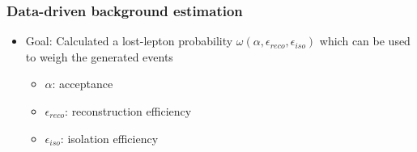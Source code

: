 \begin{frame}
  \frametitle{Data-driven background estimation}
  \begin{itemize}
    \item Goal: Calculated a lost-lepton probability $\omega(\alpha, \epsilon_{reco}, \epsilon_{iso})$ which can be used to weigh the generated events
    \begin{itemize}
      \item $\alpha$: acceptance
      \item $\epsilon_{reco}$: reconstruction efficiency
      \item $\epsilon_{iso}$: isolation efficiency
    \end{itemize}
  \end{itemize}

\end{frame}
